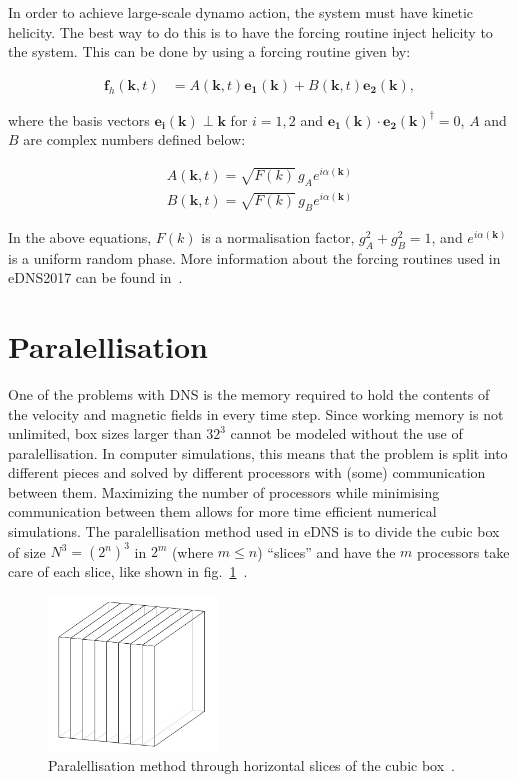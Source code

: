 \documentclass[12pt,a4paper]{report}
\begin{document}
In order to achieve large-scale dynamo action, the system must have kinetic helicity. The best way to do this is to have the forcing routine inject helicity to the system. This can be done by using a forcing routine given by:

\begin{align}
 \bm f_h(\bm k, t) &= A(\bm k, t) \bm{e_1}(\bm k) + B(\bm k, t) \bm{e_2}(\bm k), \nonumber
\end{align}

where the basis vectors $\bm{e_i}(\bm k) \perp \bm k$ for $i=1, 2$ and $\bm{e_1}(\bm k)\cdot \bm{e_2}(\bm k)^\dagger = 0$,  $A$ and $B$ are complex numbers defined below:

\begin{align}
 A(\bm k, t) = \sqrt{F(k)} \, g_A e^{i \alpha(\bm k)} \nonumber \\
 B(\bm k, t) = \sqrt{F(k)} \, g_B e^{i \alpha(\bm k)} \nonumber
\end{align}

In the above equations, $F(k)$ is a normalisation factor, $g_A^2+g_B^2=1$, and $e^{i\alpha(\bm k)}$ is a uniform random phase. More information about the forcing routines used in eDNS2017 can be found in~\cite{yoffe2013investigation, LinkmannMoritzFrederikLeon2016Spim}.

\section{Paralellisation}

One of the problems with DNS is the memory required to hold the contents of the velocity and magnetic fields in every time step. Since working memory is not unlimited, box sizes larger than $32^3$ cannot be modeled without the use of paralellisation. In computer simulations, this means that the problem is split into different pieces and solved by different processors with (some) communication between them. Maximizing the number of processors while minimising communication between them allows for more time efficient numerical simulations. The paralellisation method used in eDNS is to divide the cubic box of size $N^3 = (2^n)^3$ in $2^m$ (where $m\leq n$) ``slices'' and have the $m$ processors take care of each slice, like shown in fig.~\ref{fig4.1}~\cite{yoffe2013investigation}.

\begin{figure}[!ht]
\centering
\includegraphics[width=0.4\textwidth]{img/slices}
\caption{Paralellisation method through horizontal slices of the cubic box~\cite{yoffe2013investigation}.}
\label{fig4.1}
\end{figure}
\end{document}
